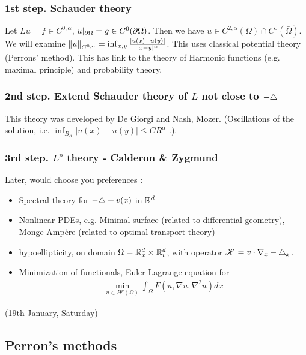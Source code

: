 \documentclass[12pt,a4paper]{article}
\renewenvironment{i}
{\begin{itemize} 
	}%
	{\end{itemize}
}
\begin{document}
\subsubsection*{1st step. Schauder theory}

Let $Lu = f \in C^{0, \alpha}$, $u|_{\partial \Omega}= g \in C^0(\partial \Omega)$. Then we have $u\in C^{2,\alpha}(\Omega) \cap C^0(\bar{\Omega})$. We will examine $\snorms{u}{C^{0, \alpha}}= \inf_{x,y} \frac{|u(x)-u(y)|}{|x-y|^{\alpha}}$. This uses classical potential theory (Perrons' method). This has link to the theory of Harmonic functions (e.g. maximal principle) and probability theory.

\subsubsection*{2nd step. Extend Schauder theory of $L$ not close to $-\triangle$}

This theory was developed by De Giorgi and Nash, Mozer. (Oscillations of the solution, i.e. $\inf_{B_R}|u(x)-u(y)| \leq CR^{\alpha}$ .).

\subsubsection*{3rd step. $L^p$ theory - Calderon \& Zygmund} 
\s

Later, would choose you preferences :
\begin{i}
\item Spectral theory for $-\triangle  + v(x)$ in $\mathbb{R}^d$

\item Nonlinear PDEs, e.g. Minimal surface (related to differential geometry), Monge-Amp\`{e}re (related to optimal transport theory)

\item hypoellipticity, on domain $\Omega = \mathbb{R}^d_x \times \mathbb{R}^d_v$, with operator $\mathscr{K} = v\cdot \nabla_x - \triangle_x$. 

\item Minimization of functionals, Euler-Lagrange equation for
\begin{align*}
\min_{u\in H^p(\Omega)} \int_{\Omega} F(u, \nabla u, \nabla^2 u) dx
\end{align*}
\end{i}
\s

\newday

(19th January, Saturday)
\s

\subsection*{Perron's methods}
\end{document}
